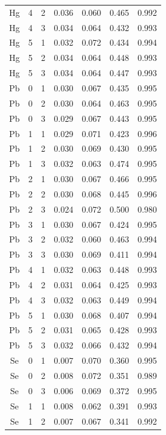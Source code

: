 \documentclass[ms, hidelinks]{uncgdissertationexp3}
\theoremstyle{plain}
\theoremstyle{definition}
\theoremstyle{remark}
\begin{document}
\begin{longtable}{ccccccc}
  Hg & 4 & 2 & 0.036 & 0.060 & 0.465 & 0.992\\
  \rowcolor{gray!6}  Hg & 4 & 3 & 0.034 & 0.064 & 0.432 & 0.993\\
  Hg & 5 & 1 & 0.032 & 0.072 & 0.434 & 0.994\\
  \rowcolor{gray!6}  Hg & 5 & 2 & 0.034 & 0.064 & 0.448 & 0.993\\
  Hg & 5 & 3 & 0.034 & 0.064 & 0.447 & 0.993\\
  \rowcolor{gray!6}  Pb & 0 & 1 & 0.030 & 0.067 & 0.435 & 0.995\\
  Pb & 0 & 2 & 0.030 & 0.064 & 0.463 & 0.995\\
  \rowcolor{gray!6}  Pb & 0 & 3 & 0.029 & 0.067 & 0.443 & 0.995\\
  Pb & 1 & 1 & 0.029 & 0.071 & 0.423 & 0.996\\
  \rowcolor{gray!6}  Pb & 1 & 2 & 0.030 & 0.069 & 0.430 & 0.995\\
  Pb & 1 & 3 & 0.032 & 0.063 & 0.474 & 0.995\\
  \rowcolor{gray!6}  Pb & 2 & 1 & 0.030 & 0.067 & 0.466 & 0.995\\
  Pb & 2 & 2 & 0.030 & 0.068 & 0.445 & 0.996\\
  \rowcolor{gray!6}  Pb & 2 & 3 & 0.024 & 0.072 & 0.500 & 0.980\\
  Pb & 3 & 1 & 0.030 & 0.067 & 0.424 & 0.995\\
  \rowcolor{gray!6}  Pb & 3 & 2 & 0.032 & 0.060 & 0.463 & 0.994\\
  Pb & 3 & 3 & 0.030 & 0.069 & 0.411 & 0.994\\
  \rowcolor{gray!6}  Pb & 4 & 1 & 0.032 & 0.063 & 0.448 & 0.993\\
  Pb & 4 & 2 & 0.031 & 0.064 & 0.425 & 0.993\\
  \rowcolor{gray!6}  Pb & 4 & 3 & 0.032 & 0.063 & 0.449 & 0.994\\
  Pb & 5 & 1 & 0.030 & 0.068 & 0.407 & 0.994\\
  \rowcolor{gray!6}  Pb & 5 & 2 & 0.031 & 0.065 & 0.428 & 0.993\\
  Pb & 5 & 3 & 0.032 & 0.066 & 0.432 & 0.994\\
  \rowcolor{gray!6}  Se & 0 & 1 & 0.007 & 0.070 & 0.360 & 0.995\\
  Se & 0 & 2 & 0.008 & 0.072 & 0.351 & 0.989\\
  \rowcolor{gray!6}  Se & 0 & 3 & 0.006 & 0.069 & 0.372 & 0.995\\
  Se & 1 & 1 & 0.008 & 0.062 & 0.391 & 0.993\\
  \rowcolor{gray!6}  Se & 1 & 2 & 0.007 & 0.067 & 0.341 & 0.992\\

\end{longtable}
\end{document}
